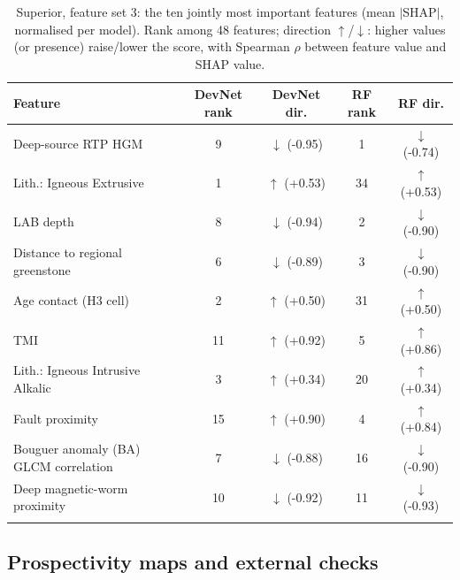 \documentclass[pdflatex,sn-apa]{sn-jnl}
\begin{document}
\begin{table}[t]
\caption{Superior, feature set 3: the ten jointly most important features (mean $|$SHAP$|$, normalised per model). Rank among 48 features; direction $\uparrow$/$\downarrow$: higher values (or presence) raise/lower the score, with Spearman $\rho$ between feature value and SHAP value.}\label{tab:shap}
\scriptsize
\setlength{\tabcolsep}{2.5pt}
\begin{tabular*}{\textwidth}{@{\extracolsep\fill}lcccc}
\toprule
Feature & DevNet rank & DevNet dir. & RF rank & RF dir. \\
\midrule
Deep-source RTP HGM & 9 & $\downarrow$ (-0.95) & 1 & $\downarrow$ (-0.74) \\
Lith.: Igneous Extrusive & 1 & $\uparrow$ (+0.53) & 34 & $\uparrow$ (+0.53) \\
LAB depth & 8 & $\downarrow$ (-0.94) & 2 & $\downarrow$ (-0.90) \\
Distance to regional greenstone & 6 & $\downarrow$ (-0.89) & 3 & $\downarrow$ (-0.90) \\
Age contact (H3 cell) & 2 & $\uparrow$ (+0.50) & 31 & $\uparrow$ (+0.50) \\
TMI & 11 & $\uparrow$ (+0.92) & 5 & $\uparrow$ (+0.86) \\
Lith.: Igneous Intrusive Alkalic & 3 & $\uparrow$ (+0.34) & 20 & $\uparrow$ (+0.34) \\
Fault proximity & 15 & $\uparrow$ (+0.90) & 4 & $\uparrow$ (+0.84) \\
Bouguer anomaly (BA) GLCM correlation & 7 & $\downarrow$ (-0.88) & 16 & $\downarrow$ (-0.90) \\
Deep magnetic-worm proximity & 10 & $\downarrow$ (-0.92) & 11 & $\downarrow$ (-0.93) \\
\botrule
\end{tabular*}
\end{table}

\subsection{Prospectivity maps and external checks}\label{sec:res-maps}
\end{document}
